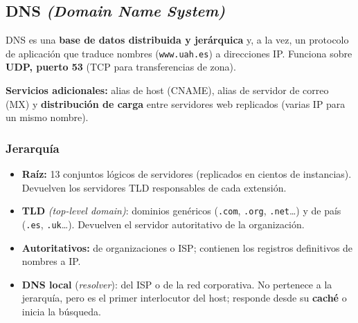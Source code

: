 \documentclass[11pt,a4paper]{article}
\newcommand{\en}[1]{\emph{(#1)}}
\begin{document}
\subsection{DNS \en{Domain Name System}}

DNS es una \textbf{base de datos distribuida y jerárquica} y, a la vez, un protocolo de aplicación que traduce nombres (\texttt{www.uah.es}) a direcciones IP. Funciona sobre \textbf{UDP, puerto 53} (TCP para transferencias de zona).

\textbf{Servicios adicionales:} alias de host (CNAME), alias de servidor de correo (MX) y \textbf{distribución de carga} entre servidores web replicados (varias IP para un mismo nombre).

\subsubsection{Jerarquía}

\begin{center}
\end{center}

\begin{itemize}
  \item \textbf{Raíz:} 13 conjuntos lógicos de servidores (replicados en cientos de instancias). Devuelven los servidores TLD responsables de cada extensión.
  \item \textbf{TLD} \en{top-level domain}: dominios genéricos (\texttt{.com}, \texttt{.org}, \texttt{.net}\dots) y de país (\texttt{.es}, \texttt{.uk}\dots). Devuelven el servidor autoritativo de la organización.
  \item \textbf{Autoritativos:} de organizaciones o ISP; contienen los registros definitivos de nombres a IP.
  \item \textbf{DNS local} (\emph{resolver}): del ISP o de la red corporativa. No pertenece a la jerarquía, pero es el primer interlocutor del host; responde desde su \textbf{caché} o inicia la búsqueda.
\end{itemize}
\end{document}
